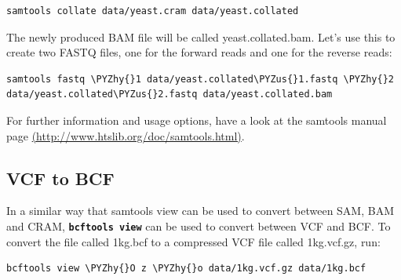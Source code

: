 \documentclass[11pt]{article}
\makeatletter
\def\PYZus{\char`\_}
\def\PYZhy{\char`\-}
\newcommand{\boxspacing}{\kern\kvtcb@left@rule\kern\kvtcb@boxsep}
\newcommand{\prompt}[4]{
        {\ttfamily\llap{{\color{blue}\LARGE\faKeyboardO\hspace{3pt}#4}}\vspace{-\baselineskip}}
    }
\makeatother
\begin{document}
    \begin{tcolorbox}[breakable, size=fbox, boxrule=1pt, pad at break*=1mm,colback=cellbackground, colframe=cellborder]
\prompt{In}{incolor}{ }{\boxspacing}
\begin{Verbatim}[commandchars=\\\{\}]
samtools collate data/yeast.cram data/yeast.collated
\end{Verbatim}
\end{tcolorbox}

    The newly produced BAM file will be called yeast.collated.bam. Let's use
this to create two FASTQ files, one for the forward reads and one for
the reverse reads:

    \begin{tcolorbox}[breakable, size=fbox, boxrule=1pt, pad at break*=1mm,colback=cellbackground, colframe=cellborder]
\prompt{In}{incolor}{ }{\boxspacing}
\begin{Verbatim}[commandchars=\\\{\}]
samtools fastq \PYZhy{}1 data/yeast.collated\PYZus{}1.fastq \PYZhy{}2 data/yeast.collated\PYZus{}2.fastq data/yeast.collated.bam
\end{Verbatim}
\end{tcolorbox}

    For further information and usage options, have a look at the samtools
manual page
\href{http://www.htslib.org/doc/samtools.html}{(http://www.htslib.org/doc/samtools.html)}.

    \hypertarget{vcf-to-bcf}{%
\subsection{VCF to BCF}\label{vcf-to-bcf}}

In a similar way that samtools view can be used to convert between SAM,
BAM and CRAM, \textbf{\texttt{bcftools\ view}} can be used to convert
between VCF and BCF. To convert the file called 1kg.bcf to a compressed
VCF file called 1kg.vcf.gz, run:

    \begin{tcolorbox}[breakable, size=fbox, boxrule=1pt, pad at break*=1mm,colback=cellbackground, colframe=cellborder]
\prompt{In}{incolor}{ }{\boxspacing}
\begin{Verbatim}[commandchars=\\\{\}]
bcftools view \PYZhy{}O z \PYZhy{}o data/1kg.vcf.gz data/1kg.bcf
\end{Verbatim}
\end{tcolorbox}
\end{document}
